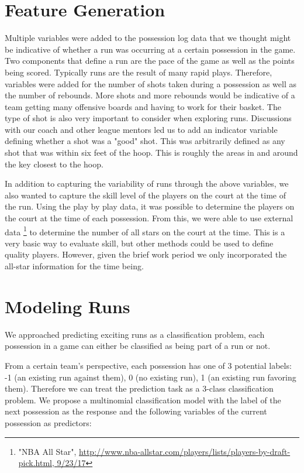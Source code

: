 \documentclass{article}
\begin{document}
\section{Feature Generation}

Multiple variables were added to the possession log data that we thought might be indicative of whether a run was occurring at a certain possession in the game.  Two components that define a run are the pace of the game as well as the points being scored. Typically runs are the result of many rapid plays. Therefore, variables were added for the number of shots taken during a possession as well as the number of rebounds. More shots and more rebounds would be indicative of a team getting many offensive boards and having to work for their basket. The type of shot is also very important to consider when exploring runs. Discussions with our coach and other league mentors led us to add an indicator variable defining whether a shot was a "good" shot. This was arbitrarily defined as any shot that was within six feet of the hoop. This is roughly the areas in and around the key closest to the hoop. \newline

In addition to capturing the variability of runs through the above variables, we also wanted to capture the skill level of the players on the court at the time of the run. Using the play by play data, it was possible to determine the players on the court at the time of each possession. From this, we were able to use external data \footnote{"NBA All Star", \url{http://www.nba-allstar.com/players/lists/players-by-draft-pick.html, 9/23/17}} to determine the number of all stars on the court at the time. This is a very basic way to evaluate skill, but other methods could be used to define quality players. However, given the brief work period we only incorporated the all-star information for the time being. 

\section{Modeling Runs}

We approached predicting exciting runs as a classification problem, each possession in a game can either be classified as being part of a run or not. \newline

From a certain team's perspective, each possession has one of 3 potential labels: -1 (an existing run against them), 0 (no existing run), 1 (an existing run favoring them). Therefore we can treat the prediction task as a 3-class classification problem. We propose a multinomial classification model with the label of the next possession as the response and the following variables of the current possession as predictors:\newline
\end{document}
